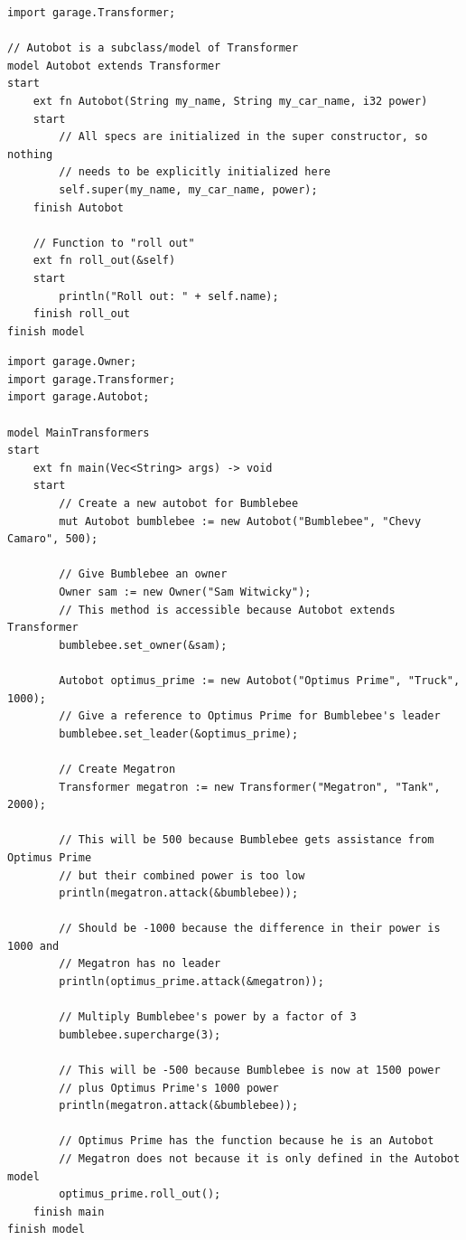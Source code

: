 \documentclass[letterpaper, 10pt, DIV=13]{scrartcl}
\numberwithin{equation}{section}
\numberwithin{figure}{section}
\numberwithin{table}{section}
\begin{document}
\begin{lstlisting}[caption = Autobot.rez, frame = single, nolol]
import garage.Transformer;

// Autobot is a subclass/model of Transformer
model Autobot extends Transformer
start
    ext fn Autobot(String my_name, String my_car_name, i32 power)
    start
        // All specs are initialized in the super constructor, so nothing
        // needs to be explicitly initialized here
        self.super(my_name, my_car_name, power);
    finish Autobot

    // Function to "roll out"
    ext fn roll_out(&self)
    start
        println("Roll out: " + self.name);
    finish roll_out
finish model
\end{lstlisting}

\begin{lstlisting}[caption = MainTransformers.rez, frame = single, nolol]
import garage.Owner;
import garage.Transformer;
import garage.Autobot;

model MainTransformers
start
    ext fn main(Vec<String> args) -> void
    start
        // Create a new autobot for Bumblebee
        mut Autobot bumblebee := new Autobot("Bumblebee", "Chevy Camaro", 500);

        // Give Bumblebee an owner
        Owner sam := new Owner("Sam Witwicky");
        // This method is accessible because Autobot extends Transformer
        bumblebee.set_owner(&sam);

        Autobot optimus_prime := new Autobot("Optimus Prime", "Truck", 1000);
        // Give a reference to Optimus Prime for Bumblebee's leader
        bumblebee.set_leader(&optimus_prime);

        // Create Megatron
        Transformer megatron := new Transformer("Megatron", "Tank", 2000);
        
        // This will be 500 because Bumblebee gets assistance from Optimus Prime
        // but their combined power is too low
        println(megatron.attack(&bumblebee));
        
        // Should be -1000 because the difference in their power is 1000 and
        // Megatron has no leader
        println(optimus_prime.attack(&megatron));

        // Multiply Bumblebee's power by a factor of 3
        bumblebee.supercharge(3);

        // This will be -500 because Bumblebee is now at 1500 power
        // plus Optimus Prime's 1000 power
        println(megatron.attack(&bumblebee));

        // Optimus Prime has the function because he is an Autobot
        // Megatron does not because it is only defined in the Autobot model
        optimus_prime.roll_out();
    finish main
finish model
\end{lstlisting}
\end{document}
